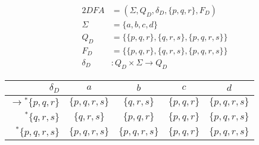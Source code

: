 {\begin{center}
\begin{minipage}[c]{0.6\textwidth}
\begin{center}
		\end{center}
	\end{minipage}%
\end{center}
\begin{center}
	\begin{minipage}[c]{0.4\textwidth}
		\begin{alignat*}{2}
			DFA       &= (\Sigma, Q_D, \delta_D, \{p,q,r\}, F_D)\\
			\Sigma    &= \{a,b,c,d\}\\
			Q_D       &= \{\{p,q,r\},\{q,r,s\},\{p,q,r,s\}\}\\
			F_D       &= \{\{p,q,r\},\{q,r,s\},\{p,q,r,s\}\}\\
			\delta_D &\colon Q_D \times \Sigma \rightarrow Q_D
		\end{alignat*}
	\end{minipage}%
	\begin{minipage}[c]{0.6\textwidth}
		\begin{center}
		\begin{tabular}{ r | c c c c }
			$\delta_D                    $ & $a          $ & $b          $ & $c          $ & $d          $ \\ \hline
			$\rightarrow{^*} \{p,q,r  \}$ & $\{p,q,r,s\}$ & $\{  q,r,s\}$ & $\{p,q,r  \}$ & $\{p,q,r,s\}$ \\
			$           {^*} \{  q,r,s\}$ & $\{  q,r,s\}$ & $\{p,q,r  \}$ & $\{p,q,r  \}$ & $\{p,q,r,s\}$ \\
			$           {^*} \{p,q,r,s\}$ & $\{p,q,r,s\}$ & $\{p,q,r,s\}$ & $\{p,q,r  \}$ & $\{p,q,r,s\}$ \\
		\end{tabular}
		\end{center}
	\end{minipage}%
\end{center}
}
